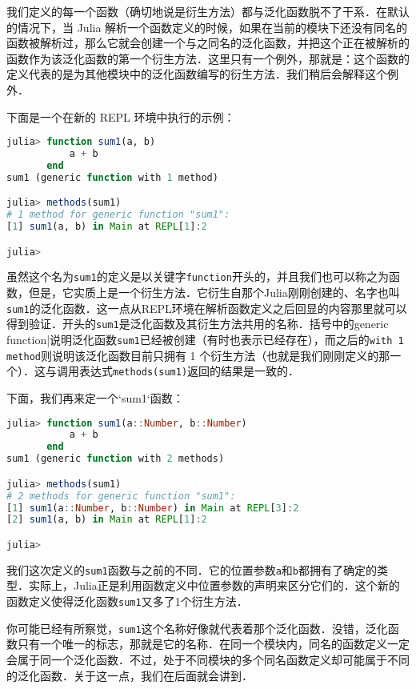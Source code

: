 我们定义的每一个函数（确切地说是衍生方法）都与泛化函数脱不了干系．在默认的情况下，当 Julia 解析一个函数定义的时候，如果在当前的模块下还没有同名的函数被解析过，那么它就会创建一个与之同名的泛化函数，并把这个正在被解析的函数作为该泛化函数的第一个衍生方法．这里只有一个例外，那就是：这个函数的定义代表的是为其他模块中的泛化函数编写的衍生方法．我们稍后会解释这个例外．

下面是一个在新的 REPL 环境中执行的示例：

\begin{lstlisting}[language=julia]
julia> function sum1(a, b)
           a + b
       end
sum1 (generic function with 1 method)

julia> methods(sum1)
# 1 method for generic function "sum1":
[1] sum1(a, b) in Main at REPL[1]:2

julia> 
\end{lstlisting}

虽然这个名为\verb|sum1|的定义是以关键字\verb|function|开头的，并且我们也可以称之为函数，但是，它实质上是一个衍生方法．它衍生自那个Julia刚刚创建的、名字也叫\verb|sum1|的泛化函数．这一点从REPL环境在解析函数定义之后回显的内容那里就可以得到验证．开头的\verb|sum1|是泛化函数及其衍生方法共用的名称．括号中的generic function|说明泛化函数\verb|sum1|已经被创建（有时也表示已经存在），而之后的\verb|with 1 method|则说明该泛化函数目前只拥有 1 个衍生方法（也就是我们刚刚定义的那一个）．这与调用表达式\verb|methods(sum1)|返回的结果是一致的．

下面，我们再来定一个`sum1`函数：

\begin{lstlisting}[language=julia]
julia> function sum1(a::Number, b::Number)
           a + b
       end
sum1 (generic function with 2 methods)

julia> methods(sum1)
# 2 methods for generic function "sum1":
[1] sum1(a::Number, b::Number) in Main at REPL[3]:2
[2] sum1(a, b) in Main at REPL[1]:2

julia> 
\end{lstlisting}

我们这次定义的\verb|sum1|函数与之前的不同．它的位置参数\verb|a|和\verb|b|都拥有了确定的类型．实际上，Julia正是利用函数定义中位置参数的声明来区分它们的．这个新的函数定义使得泛化函数\verb|sum1|又多了1个衍生方法．

你可能已经有所察觉，\verb|sum1|这个名称好像就代表着那个泛化函数．没错，泛化函数只有一个唯一的标志，那就是它的名称．在同一个模块内，同名的函数定义一定会属于同一个泛化函数．不过，处于不同模块的多个同名函数定义却可能属于不同的泛化函数．关于这一点，我们在后面就会讲到．


